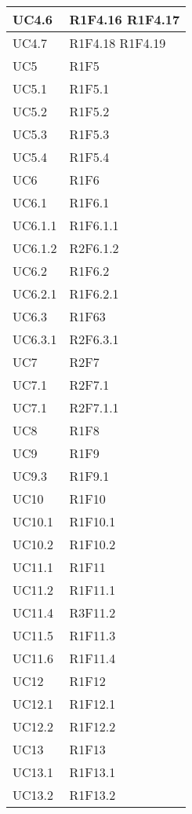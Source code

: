 \begin{center}
\begin{longtable}{|p{44mm}|p{22mm}|}
UC4.6&  
	R1F4.16  \newline
	R1F4.17  	
  \\
\hline
UC4.7& 
	R1F4.18  \newline
	R1F4.19	 
  \\
\hline
UC5& R1F5 \\
\hline
UC5.1& R1F5.1 \\
\hline
UC5.2& R1F5.2  \\
\hline
UC5.3& R1F5.3\\
\hline
UC5.4& R1F5.4 \\
\hline
UC6& R1F6 \\
\hline
UC6.1& R1F6.1 \\
\hline
UC6.1.1& R1F6.1.1 \\
\hline
UC6.1.2& R2F6.1.2 \\
\hline
UC6.2& R1F6.2 \\
\hline
UC6.2.1& R1F6.2.1 \\
\hline
UC6.3& R1F63 \\
\hline
UC6.3.1& R2F6.3.1 \\
\hline
UC7& R2F7\\
\hline
UC7.1& R2F7.1\\
\hline
UC7.1& R2F7.1.1\\
\hline
UC8& R1F8\\
\hline
UC9& R1F9\\
\hline
UC9.3& R1F9.1\\
\hline
UC10& R1F10\\
\hline
UC10.1& R1F10.1\\
\hline
UC10.2& R1F10.2\\
\hline
UC11.1& R1F11\\
\hline
UC11.2& R1F11.1\\
\hline
UC11.4& R3F11.2\\
\hline
UC11.5& R1F11.3\\
\hline
UC11.6& R1F11.4\\
\hline
UC12& R1F12\\
\hline
UC12.1& R1F12.1 \\
\hline
UC12.2& R1F12.2 \\
\hline
UC13&R1F13 \\
\hline
UC13.1& R1F13.1\\
\hline
UC13.2&R1F13.2 \\
\hline	
	\end{longtable}
\end{center}

